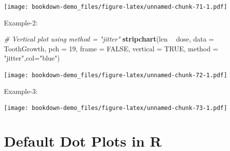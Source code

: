 \documentclass[]{book}
\newenvironment{Shaded}{\begin{snugshade}}{\end{snugshade}}
\newcommand{\KeywordTok}[1]{\textcolor[rgb]{0.13,0.29,0.53}{\textbf{#1}}}
\newcommand{\DataTypeTok}[1]{\textcolor[rgb]{0.13,0.29,0.53}{#1}}
\newcommand{\DecValTok}[1]{\textcolor[rgb]{0.00,0.00,0.81}{#1}}
\newcommand{\StringTok}[1]{\textcolor[rgb]{0.31,0.60,0.02}{#1}}
\newcommand{\CommentTok}[1]{\textcolor[rgb]{0.56,0.35,0.01}{\textit{#1}}}
\newcommand{\OtherTok}[1]{\textcolor[rgb]{0.56,0.35,0.01}{#1}}
\newcommand{\OperatorTok}[1]{\textcolor[rgb]{0.81,0.36,0.00}{\textbf{#1}}}
\newcommand{\NormalTok}[1]{#1}
\begin{document}
\texttt{[image: bookdown-demo\_files/figure-latex/unnamed-chunk-71-1.pdf]}

Example-2:

\begin{Shaded}
\begin{Highlighting}[]
\CommentTok{# Vertical plot using method = "jitter"}
\KeywordTok{stripchart}\NormalTok{(len }\OperatorTok{~}\StringTok{ }\NormalTok{dose, }\DataTypeTok{data =}\NormalTok{ ToothGrowth,}
         \DataTypeTok{pch =} \DecValTok{19}\NormalTok{, }\DataTypeTok{frame =} \OtherTok{FALSE}\NormalTok{, }\DataTypeTok{vertical =} \OtherTok{TRUE}\NormalTok{,}
         \DataTypeTok{method =} \StringTok{"jitter"}\NormalTok{,}\DataTypeTok{col=}\StringTok{"blue"}\NormalTok{)}
\end{Highlighting}
\end{Shaded}

\texttt{[image: bookdown-demo\_files/figure-latex/unnamed-chunk-72-1.pdf]}

Example-3:

\begin{Shaded}
\end{Shaded}

\texttt{[image: bookdown-demo\_files/figure-latex/unnamed-chunk-73-1.pdf]}

\chapter{Default Dot Plots in R}\label{default-dot-plots-in-r}
\end{document}
